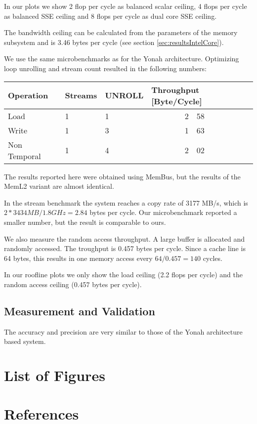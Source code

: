 \documentclass[a4paper,12pt]{article}
\begin{document}
In our plots we show 2 flop per cycle as balanced scalar ceiling, 4 flops
per cycle as balanced SSE ceiling and 8 flops per cycle as dual core SSE
ceiling.

The bandwidth ceiling can be calculated from the parameters of the memory
subsystem and is 3.46 bytes per cycle (see section
\ref{sec:resultsIntelCore}).

We use the same microbenchmarks as for the Yonah architecture. Optimizing loop
unrolling and stream count resulted in  the following numbers:

\begin{center}
\begin{tabular}{lllr@{.}l}
\toprule
Operation & Streams & UNROLL &  \multicolumn{2}{l}{Throughput
[Byte/Cycle]} \\
\midrule
Load  &  1 & 1 & 2&58\\
Write &  1 & 3 & 1&63\\
Non Temporal & 1 & 4 & 2&02\\
\bottomrule
\end{tabular}
\end{center}

The results reported here were obtained using MemBus, but the results of the
MemL2 variant are almost identical.
 
In the stream benchmark \cite{stream} the system reaches a copy rate of 3177
MB/s, which is $2*3434MB/1.8GHz=2.84$ bytes per cycle. Our microbenchmark
reported a smaller number, but the result is comparable to ours.

We also measure the random access throughput. A large buffer is allocated and
randomly accessed. The troughput is 0.457 bytes per cycle. Since a cache line is
64 bytes, this results in one memory access every $64/0.457=140$ cycles.

In our roofline plots we only show the load ceiling (2.2 flops per cycle) and
the random access ceiling (0.457 bytes per cycle).

\subsection{Measurement and Validation}
The accuracy and precision are very similar to those of the Yonah architecture
based system.


\newpage
\section{List of Figures}
\renewcommand{\listfigurename}{}
\vskip -1cm
\listoffigures

\newpage
\renewcommand\refname{\vskip -1cm}
\section{References}


\end{document}
